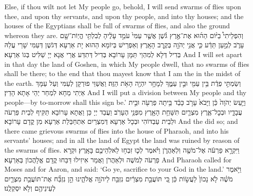 {Else, if thou wilt not let My people go, behold, I will send swarms of flies upon thee, and upon thy servants, and upon thy people, and into thy houses; and the houses of the Egyptians shall be full of swarms of flies, and also the ground whereon they are.}{}
{וְהִפְלֵיתִי֩ בַיּ֨וֹם הַה֜וּא אֶת־אֶ֣רֶץ גֹּ֗שֶׁן אֲשֶׁ֤ר עַמִּי֙ עֹמֵ֣ד עָלֶ֔יהָ לְבִלְתִּ֥י הֱיֽוֹת־שָׁ֖ם עָרֹ֑ב לְמַ֣עַן תֵּדַ֔ע כִּ֛י אֲנִ֥י יְהֹוָ֖ה בְּקֶ֥רֶב הָאָֽרֶץ׃
}
{וְאַפְרֵישׁ בְּיוֹמָא הַהוּא יָת אַרְעָא דְּגֹשֶׁן דְּעַמִּי שָׁרֵי עֲלַהּ בְּדִיל דְּלָא לְמִהְוֵי תַּמָּן עָרוֹבָא בְּדִיל דְּתִדַּע אֲרֵי אֲנָא יְיָ שַׁלִּיט בְּגוֹ אַרְעָא׃}
{And I will set apart in that day the land of Goshen, in which My people dwell, that no swarms of flies shall be there; to the end that thou mayest know that I am the \lord\space in the midst of the earth.}{}
{וְשַׂמְתִּ֣י פְדֻ֔ת בֵּ֥ין עַמִּ֖י וּבֵ֣ין עַמֶּ֑ךָ לְמָחָ֥ר יִהְיֶ֖ה הָאֹ֥ת הַזֶּֽה׃
}
{וַאֲשַׁוֵּי פוּרְקָן לְעַמִּי וְעַל עַמָּךְ אַיְתִי מַחָא לִמְחַר יְהֵי אָתָא הָדֵין׃}
{And I will put a division between My people and thy people—by to-morrow shall this sign be.’}{}
{וַיַּ֤עַשׂ יְהֹוָה֙ כֵּ֔ן וַיָּבֹא֙ עָרֹ֣ב כָּבֵ֔ד בֵּ֥יתָה פַרְעֹ֖ה וּבֵ֣ית עֲבָדָ֑יו וּבְכׇל־אֶ֧רֶץ מִצְרַ֛יִם תִּשָּׁחֵ֥ת הָאָ֖רֶץ מִפְּנֵ֥י הֶעָרֹֽב׃
}
{וַעֲבַד יְיָ כֵּן וַאֲתָא עָרוֹבָא תַּקִּיף לְבֵית פַּרְעֹה וּלְבֵית עַבְדּוֹהִי וּבְכָל אַרְעָא דְּמִצְרַיִם אִתְחַבַּלַת אַרְעָא מִן קֳדָם עָרוֹבָא׃}
{And the \lord\space did so; and there came grievous swarms of flies into the house of Pharaoh, and into his servants’ houses; and in all the land of Egypt the land was ruined by reason of the swarms of flies.}{}
{וַיִּקְרָ֣א פַרְעֹ֔ה אֶל־מֹשֶׁ֖ה וּֽלְאַהֲרֹ֑ן וַיֹּ֗אמֶר לְכ֛וּ זִבְח֥וּ לֵאלֹֽהֵיכֶ֖ם בָּאָֽרֶץ׃
}
{וּקְרָא פַרְעֹה לְמֹשֶׁה וּלְאַהֲרֹן וַאֲמַר אִיזִילוּ דַּבַּחוּ קֳדָם אֱלָהֲכוֹן בְּאַרְעָא׃}
{And Pharaoh called for Moses and for Aaron, and said: ‘Go ye, sacrifice to your God in the land.’}{}
{וַיֹּ֣אמֶר מֹשֶׁ֗ה לֹ֤א נָכוֹן֙ לַעֲשׂ֣וֹת כֵּ֔ן כִּ֚י תּוֹעֲבַ֣ת מִצְרַ֔יִם נִזְבַּ֖ח לַיהֹוָ֣ה אֱלֹהֵ֑ינוּ הֵ֣ן נִזְבַּ֞ח אֶת־תּוֹעֲבַ֥ת מִצְרַ֛יִם לְעֵינֵיהֶ֖ם וְלֹ֥א יִסְקְלֻֽנוּ׃
}
